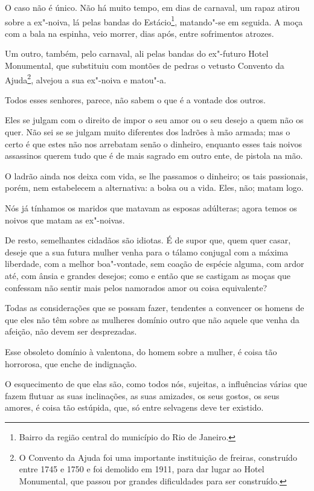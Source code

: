 O caso não é único. Não há muito tempo, em dias de carnaval, um rapaz
atirou sobre a ex"-noiva, lá pelas bandas do Estácio\footnote{Bairro da
  região central do município do Rio de Janeiro.}, matando"-se em
seguida. A moça com a bala na espinha, veio morrer, dias após, entre
sofrimentos atrozes.

Um outro, também, pelo carnaval, ali pelas bandas do ex"-futuro Hotel
Monumental, que substituiu com montões de pedras o vetusto Convento da
Ajuda\footnote{O Convento da Ajuda foi uma importante instituição de
  freiras, construído entre 1745 e 1750 e foi demolido em 1911, para dar
  lugar ao Hotel Monumental, que passou por grandes dificuldades para
  ser construído.}, alvejou a sua ex"-noiva e matou"-a.

Todos esses senhores, parece, não sabem o que é a vontade dos outros.

Eles se julgam com o direito de impor o seu amor ou o seu desejo a quem
não os quer. Não sei se se julgam muito diferentes dos ladrões à mão
armada; mas o certo é que estes não nos arrebatam senão o dinheiro,
enquanto esses tais noivos assassinos querem tudo que é de mais sagrado
em outro ente, de pistola na mão.

O ladrão ainda nos deixa com vida, se lhe passamos o dinheiro; os tais
passionais, porém, nem estabelecem a alternativa: a bolsa ou a vida.
Eles, não; matam logo.

Nós já tínhamos os maridos que matavam as esposas adúlteras; agora temos
os noivos que matam as ex"-noivas.

De resto, semelhantes cidadãos são idiotas. É de supor que, quem quer
casar, deseje que a sua futura mulher venha para o tálamo conjugal com a
máxima liberdade, com a melhor boa"-vontade, sem coação de espécie
alguma, com ardor até, com ânsia e grandes desejos; como e então que se
castigam as moças que confessam não sentir mais pelos namorados amor ou
coisa equivalente?

Todas as considerações que se possam fazer, tendentes a convencer os
homens de que eles não têm sobre as mulheres domínio outro que não
aquele que venha da afeição, não devem ser desprezadas.

Esse obsoleto domínio à valentona, do homem sobre a mulher, é coisa tão
horrorosa, que enche de indignação.

O esquecimento de que elas são, como todos nós, sujeitas, a influências
várias que fazem flutuar as suas inclinações, as suas amizades, os seus
gostos, os seus amores, é coisa tão estúpida, que, só entre selvagens
deve ter existido.

